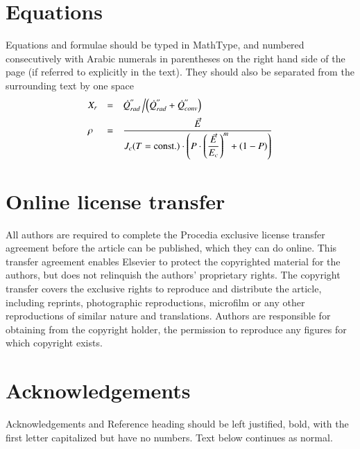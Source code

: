 \documentclass[5p,times,procedia]{elsarticle}
\begin{document}
\section{Equations}
Equations and formulae should be typed in MathType, and numbered consecutively with Arabic numerals in parentheses on the right hand side of the page (if referred to explicitly in the text). They should also be separated from the surrounding text by one space
\begin{equation}
\begin{array}{lcl}
\displaystyle X_r &=& \displaystyle\dot{Q}^{''}_{rad}\left/\left(\dot{Q}^{''}_{rad} + \dot{Q}^{''}_{conv}\right)\right.\\[6pt]
\displaystyle \rho &=& \displaystyle\frac{\vec{E}}{J_c(T={\rm const.})\cdot\left(P\cdot\left(\displaystyle\frac{\vec{E}}{E_c}\right)^m+(1-P)\right)}
\end{array}
\end{equation}


\section{Online license transfer}
All authors are required to complete the Procedia exclusive license transfer agreement before the article can be published, which they can do online. This transfer agreement enables Elsevier to protect the copyrighted material for the authors, but does not relinquish the authors' proprietary rights. The copyright transfer covers the exclusive rights to reproduce and distribute the article, including reprints, photographic reproductions, microfilm or any other reproductions of similar nature and translations. Authors are responsible for obtaining from the copyright holder, the permission to reproduce any figures for which copyright exists.

\vfill\pagebreak

\section*{Acknowledgements}

Acknowledgements and Reference heading should be left justified, bold, with the first letter capitalized but have no numbers. Text below continues as normal.


\end{document}
